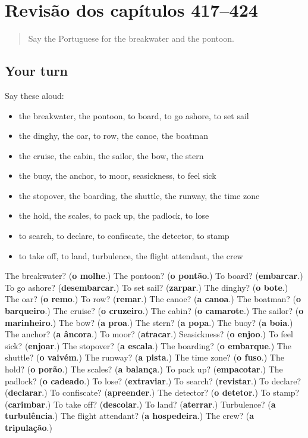 \section[(dialogue)]{Revisão dos capítulos 417–424}

\label{lesson:PT-R424-revisao-417-424}



\begin{quote}
Say the Portuguese for the breakwater and the pontoon.
\end{quote}

\subsection*{Your turn}
Say these aloud:

\begin{itemize}
\raggedright
  \item the breakwater, the pontoon, to board, to go ashore, to set sail
  \item the dinghy, the oar, to row, the canoe, the boatman
  \item the cruise, the cabin, the sailor, the bow, the stern
  \item the buoy, the anchor, to moor, seasickness, to feel sick
  \item the stopover, the boarding, the shuttle, the runway, the time zone
  \item the hold, the scales, to pack up, the padlock, to lose
  \item to search, to declare, to confiscate, the detector, to stamp
  \item to take off, to land, turbulence, the flight attendant, the crew
\end{itemize}

\begin{tcolorbox}[breakable,colback=teal!4,colframe=teal!35!black,title={Before you move on}]
The breakwater? (\textbf{o molhe}.) The pontoon? (\textbf{o pontão}.) To board? (\textbf{embarcar}.) To go ashore? (\textbf{desembarcar}.) To set sail? (\textbf{zarpar}.) The dinghy? (\textbf{o bote}.) The oar? (\textbf{o remo}.) To row? (\textbf{remar}.) The canoe? (\textbf{a canoa}.) The boatman? (\textbf{o barqueiro}.) The cruise? (\textbf{o cruzeiro}.) The cabin? (\textbf{o camarote}.) The sailor? (\textbf{o marinheiro}.) The bow? (\textbf{a proa}.) The stern? (\textbf{a popa}.) The buoy? (\textbf{a boia}.) The anchor? (\textbf{a âncora}.) To moor? (\textbf{atracar}.) Seasickness? (\textbf{o enjoo}.) To feel sick? (\textbf{enjoar}.) The stopover? (\textbf{a escala}.) The boarding? (\textbf{o embarque}.) The shuttle? (\textbf{o vaivém}.) The runway? (\textbf{a pista}.) The time zone? (\textbf{o fuso}.) The hold? (\textbf{o porão}.) The scales? (\textbf{a balança}.) To pack up? (\textbf{empacotar}.) The padlock? (\textbf{o cadeado}.) To lose? (\textbf{extraviar}.) To search? (\textbf{revistar}.) To declare? (\textbf{declarar}.) To confiscate? (\textbf{apreender}.) The detector? (\textbf{o detetor}.) To stamp? (\textbf{carimbar}.) To take off? (\textbf{descolar}.) To land? (\textbf{aterrar}.) Turbulence? (\textbf{a turbulência}.) The flight attendant? (\textbf{a hospedeira}.) The crew? (\textbf{a tripulação}.)
\end{tcolorbox}
